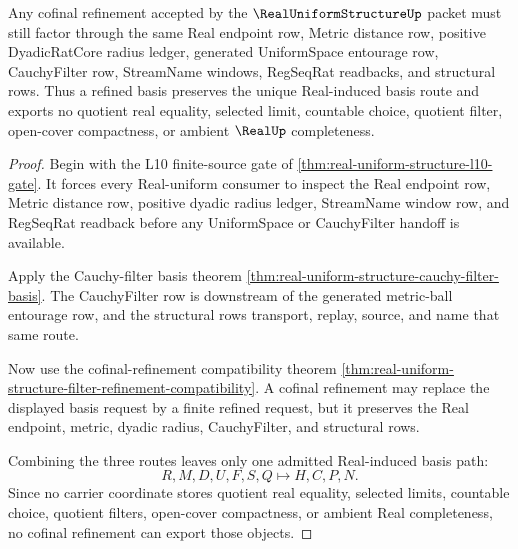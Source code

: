 \begin{theorem}
\label{thm:real-uniform-structure-basis-refinement-uniqueness}
Any cofinal refinement accepted by the $\RealUniformStructureUp$ packet must still factor through the same Real endpoint row, Metric distance row, positive DyadicRatCore radius ledger, generated UniformSpace entourage row, CauchyFilter row, StreamName windows, RegSeqRat readbacks, and structural rows. Thus a refined basis preserves the unique Real-induced basis route and exports no quotient real equality, selected limit, countable choice, quotient filter, open-cover compactness, or ambient $\RealUp$ completeness.
\end{theorem}
\begin{proof}
Begin with the L10 finite-source gate of \autoref{thm:real-uniform-structure-l10-gate}. It forces every Real-uniform consumer to inspect the Real endpoint row, Metric distance row, positive dyadic radius ledger, StreamName window row, and RegSeqRat readback before any UniformSpace or CauchyFilter handoff is available.

Apply the Cauchy-filter basis theorem \autoref{thm:real-uniform-structure-cauchy-filter-basis}. The CauchyFilter row is downstream of the generated metric-ball entourage row, and the structural rows transport, replay, source, and name that same route.

Now use the cofinal-refinement compatibility theorem \autoref{thm:real-uniform-structure-filter-refinement-compatibility}. A cofinal refinement may replace the displayed basis request by a finite refined request, but it preserves the Real endpoint, metric, dyadic radius, CauchyFilter, and structural rows.

Combining the three routes leaves only one admitted Real-induced basis path:
$$
R,M,D,U,F,S,Q \longmapsto H,C,P,N .
$$
Since no carrier coordinate stores quotient real equality, selected limits, countable choice, quotient filters, open-cover compactness, or ambient Real completeness, no cofinal refinement can export those objects.
\end{proof}

